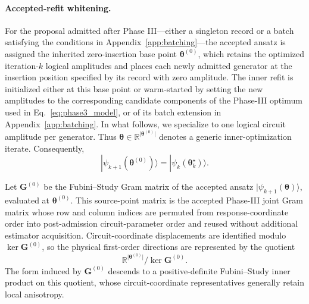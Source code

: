 \documentclass[
  reprint,
  amsmath,
  amssymb,
  aps,
  pra,
  nofootinbib,
  superscriptaddress,
  floatfix
]{revtex4-2}
\newcommand{\ket}[1]{|#1\rangle}
\begin{document}
\paragraph*{Accepted-refit whitening.}
For the proposal admitted after Phase III---either a singleton record or a
batch satisfying the conditions in Appendix~\ref{app:batching}---the accepted
ansatz is assigned the inherited zero-insertion base point
\(\boldsymbol\theta^{(0)}\), which retains the optimized iteration-\(k\)
logical amplitudes and places each newly admitted generator at the insertion
position specified by its record with zero amplitude. The inner refit is
initialized either at this base point or warm-started by setting the new
amplitudes to the corresponding candidate components of the Phase-III optimum
used in Eq.~\eqref{eq:phase3_model}, or of its batch extension in
Appendix~\ref{app:batching}. In what follows, we specialize to one logical
circuit amplitude per generator.
Thus
\(\boldsymbol\theta\in
\mathbb R^{\lvert\boldsymbol\theta^{(0)}\rvert}\)
denotes a generic inner-optimization iterate. Consequently,
\[
\ket{\psi_{k+1}(\boldsymbol\theta^{(0)})}
=
\ket{\psi_k(\boldsymbol\theta_k^\star)}.
\]

Let \(\mathbf G^{(0)}\) be the Fubini--Study Gram matrix of the accepted
ansatz \(\ket{\psi_{k+1}(\boldsymbol\theta)}\), evaluated at
\(\boldsymbol\theta^{(0)}\). This source-point matrix is the accepted
Phase-III joint Gram matrix whose row and column indices are permuted from
response-coordinate order into post-admission circuit-parameter order and
reused without additional estimator acquisition. Circuit-coordinate
displacements are identified modulo
\(\ker\mathbf G^{(0)}\), so the physical first-order directions are
represented by the quotient
\begin{equation}
\mathbb R^{\lvert\boldsymbol\theta^{(0)}\rvert}
\big/
\ker\mathbf G^{(0)}.
\label{eq:accepted_refit_quotient}
\end{equation}
The form induced by \(\mathbf G^{(0)}\) descends to a positive-definite
Fubini--Study inner product on this quotient, whose circuit-coordinate
representatives generally retain local anisotropy.
\end{document}
